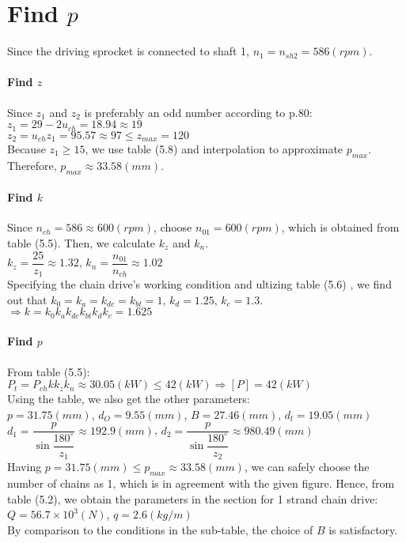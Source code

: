 \section{Find $ p $}
Since the driving sprocket is connected to shaft 1, $ n_1 = n_{sh2} = 586\unit{(rpm)} $.

\paragraph{Find $ z $}
Since $ z_1 $ and $ z_2 $ is preferably an odd number according to p.80:\\
$ z_1 = 29 - 2u_{ch} = 18.94 \approx 19$\\
$ z_2 = u_{ch}z_1 = 95.57 \approx 97 \leq z_{max} = 120$\\
Because $ z_1 \geq 15 $, we use table (5.8) and interpolation to approximate $ p_{max} $. Therefore, $ p_{max} \approx 33.58 \unit{(mm)} $.

\paragraph{Find $ k $}
Since $ n_{ch} = 586 \approx 600 \unit{(rpm)}$, choose $ n_{01} = 600\unit{(rpm)} $, which is obtained from table (5.5). Then, we calculate $ k_z $ and $ k_n $.\\
$ k_z = \dfrac{25}{z_1} \approx 1.32$, 
$ k_n = \dfrac{n_{01}}{n_{ch}} \approx 1.02$\\
Specifying the chain drive's working condition and ultizing table (5.6) , we find out that $ k_0=k_a=k_{dc}=k_{bt}=1 $, $ k_d=1.25 $, $ k_c=1.3 $.\\
$\Rightarrow k = k_0k_ak_{dc}k_{bt}k_dk_c = 1.625$

\paragraph{Find $ p $}
From table (5.5):\\
$ P_t = P_{ch}kk_zk_n \approx 30.05 \unit{(kW)} \leq 42 \unit{(kW)} \Rightarrow [P] = 42 \unit{(kW)}$\\
Using the table, we also get the other parameters:\\
$ p = 31.75 \unit{(mm)}$, $ d_O = 9.55 \unit{(mm)} $, $ B = 27.46 \unit{(mm)} $, $ d_l = 19.05 \unit{(mm)} $\\
$ d_1=\dfrac{p}{\sin{\dfrac{180^\circ}{z_1}}} \approx 192.9 \unit{(mm)} $, 
$ d_2=\dfrac{p}{\sin{\dfrac{180^\circ}{z_2}}} \approx  980.49 \unit{(mm)}$\\
Having $ p = 31.75 \unit{(mm) \leq p_{max}} \approx 33.58 \unit{(mm)} $, we can safely choose the number of chains as 1, which is in agreement with the given figure. Hence, from table (5.2), we obtain the parameters in the section for 1 strand chain drive:\\
$ Q = 56.7\times10^3\unit{(N)} $, $ q = 2.6\unit{(kg/m)} $\\
By comparison to the conditions in the sub-table, the choice of $ B $ is satisfactory.

